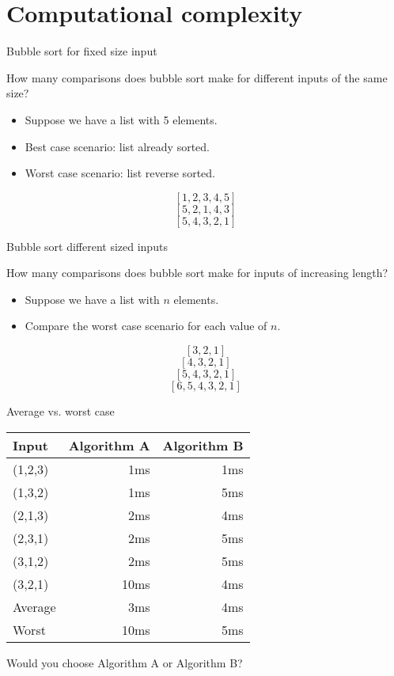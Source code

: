 
\section{Computational complexity}


\begin{frame}{Bubble sort for fixed size input}
  \begin{alertblock}{How many comparisons does bubble sort make for different inputs of the same size?}
    \begin{itemize}
      \item Suppose we have a list with 5 elements.
      \item Best case scenario: list already sorted.
      \item Worst case scenario: list reverse sorted.
    \end{itemize}
    \[ [1,2,3,4,5] \]
    \[ [5,2,1,4,3] \]
    \[ [5,4,3,2,1] \]
  \end{alertblock}
\end{frame}


\begin{frame}{Bubble sort different sized inputs}
  \begin{alertblock}{How many comparisons does bubble sort make for inputs of increasing length?}
    \begin{itemize}
      \item Suppose we have a list with $n$ elements.
      \item Compare the worst case scenario for each value of $n$.
    \end{itemize}
    \[ [3,2,1] \]
    \[ [4,3,2,1] \]
    \[ [5,4,3,2,1] \]
    \[ [6,5,4,3,2,1] \]
  \end{alertblock}
\end{frame}


\begin{frame}{Average vs. worst case}
  \begin{table}
    \begin{tabular}{p{2cm}rr}
      Input & Algorithm A & \hspace{1cm} Algorithm B \\
      \hline
      (1,2,3) &  1ms &  1ms \\
      (1,3,2) &  1ms &  5ms \\
      (2,1,3) &  2ms &  4ms \\
      (2,3,1) &  2ms &  5ms \\
      (3,1,2) &  2ms &  5ms \\
      (3,2,1) & 10ms &  4ms \\
      \hline
      Average &  3ms &  4ms \\
      Worst   & 10ms &  5ms
    \end{tabular}
  \end{table}
  \begin{center}
    Would you choose Algorithm A or Algorithm B?
  \end{center}
\end{frame}


